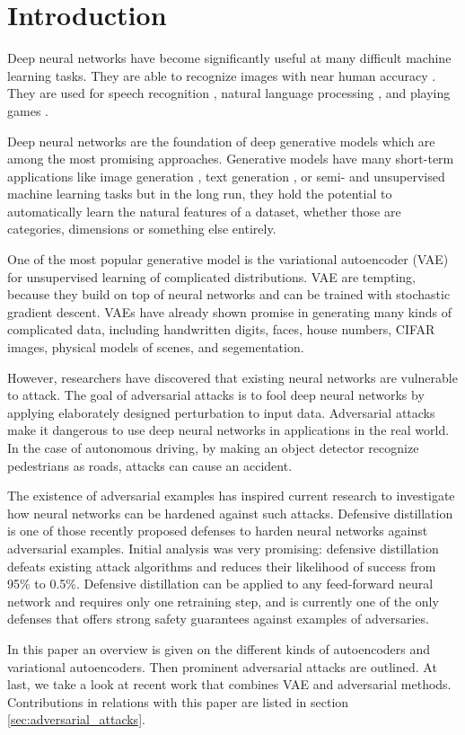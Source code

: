 \section{Introduction}\label{sec:introduction}
Deep neural networks have become significantly useful at many difficult machine
learning tasks. They are able to recognize images with near human accuracy
\cite{lecun1998gradient}. They are used for speech recognition
\cite{hinton2012deep}, natural language processing \cite{andor2016globally}, and
playing games \cite{silver2016mastering}.

Deep neural networks are the foundation of deep generative models which are
among the most promising approaches. Generative models have many short-term
applications like image generation \cite{goodfellow2014generative}, text
generation \cite{semeniuta2017hybrid}, or semi- and unsupervised machine
learning tasks \cite{radford2015unsupervised}  but in the long run, they hold
the potential to automatically learn the natural features of a dataset, whether
those are categories, dimensions or something else entirely.

One of the most popular generative model is the variational autoencoder (VAE)
for unsupervised learning of complicated distributions. VAE are tempting,
because they build on top of neural networks and can be trained with stochastic
gradient descent. VAEs have already shown promise in generating many kinds of
complicated data, including handwritten digits, faces, house numbers, CIFAR
images, physical models of scenes, and segementation.

However, researchers have discovered that existing neural networks are
vulnerable to attack. The goal of adversarial attacks is to fool deep neural
networks by applying elaborately designed perturbation to input data.
Adversarial attacks make it dangerous to use deep neural networks in
applications in the real world. In the case of autonomous driving, by making an
object detector recognize pedestrians as roads, attacks can cause an accident.

The existence of adversarial examples has inspired current research to
investigate how neural networks can be hardened against such attacks. Defensive
distillation is one of those recently proposed defenses to harden neural
networks against adversarial examples. Initial analysis was very promising:
defensive distillation defeats existing attack algorithms and reduces their
likelihood of success from 95\% to 0.5\%. Defensive distillation can be applied
to any feed-forward neural network and requires only one retraining step, and is
currently one of the only defenses that offers strong safety guarantees against
examples of adversaries.

In this paper an overview is given on the different kinds of autoencoders and
variational autoencoders. Then prominent adversarial attacks are outlined. At
last, we take a look at recent work that combines VAE and adversarial methods.
Contributions in relations with this paper are listed in section
\ref{sec:adversarial_attacks}.